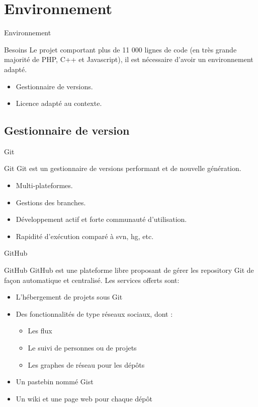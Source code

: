 \section{Environnement}
\begin{frame}{Environnement}
	\begin{block}{Besoins}
        Le projet comportant plus de 11 000 lignes de code (en très grande majorité
        de PHP, C++ et Javascript), il est nécessaire d'avoir un environnement 
        adapté.

	    \begin{itemize}
            \item Gestionnaire de versions.
            \item Licence adapté au contexte.
	    \end{itemize}
	\end{block}
\end{frame}


\subsection{Gestionnaire de version}
\begin{frame}{Git}
	\begin{block}{Git}
        Git est un gestionnaire de versions performant et de nouvelle génération.

        \begin{itemize}
        \item Multi-plateformes.
        \item Gestions des branches.
        \item Développement actif et forte communauté d'utilisation.
        \item Rapidité d'exécution comparé à svn, hg, etc. 
        \end{itemize}
	\end{block}
\end{frame}


\begin{frame}{GitHub}
	\begin{block}{GitHub}
    GitHub est une plateforme libre proposant de gérer les repository Git de 
    façon automatique et centralisé. Les services offerts sont:

        \begin{itemize}
        \item L'hébergement de projets sous Git
        \item Des fonctionnalités de type réseaux sociaux, dont :
            \begin{itemize}
            \item Les flux
            \item Le suivi de personnes ou de projets
            \item Les graphes de réseau pour les dépôts
            \end{itemize}
        \item Un pastebin nommé Gist
        \item Un wiki et une page web pour chaque dépôt
        \end{itemize}
    \end{block}
\end{frame}


